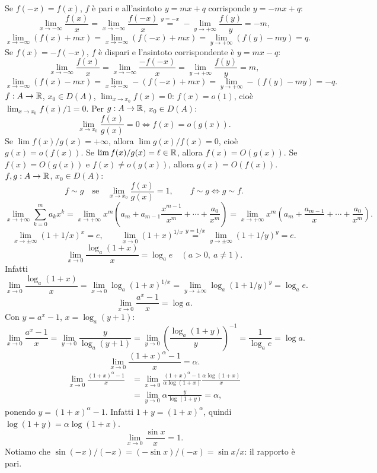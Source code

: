 Se $f(-x)=f(x)$, $f$ è pari e all'asintoto $y=mx+q$ corrisponde $y=-mx+q$:
\[
\lim_{x\to-\infty}\frac{f(x)}x=\lim_{x\to-\infty}\frac{f(-x)}x\overset{y=-x}= -\lim_{y\to+\infty}\frac{f(y)}y=-m,
\]
\[
\lim_{x\to-\infty}(f(x)+mx)=\lim_{x\to-\infty}(f(-x)+mx)=\lim_{y\to+\infty}(f(y)-my)=q.
\]
Se $f(x)=-f(-x)$, $f$ è dispari e l'asintoto corrispondente è $y=mx-q$:
\[
\lim_{x\to-\infty}\frac{f(x)}x=\lim_{x\to-\infty}\frac{-f(-x)}x=\lim_{y\to+\infty}\frac{f(y)}y=m,
\]
\[
\lim_{x\to-\infty}(f(x)-mx)=\lim_{x\to-\infty}-(f(-x)+mx)=\lim_{y\to+\infty}-(f(y)-my)=-q.
\]
$f:A\to\mathbb R$, $x_0\in D(A)$, $\lim_{x\to x_0}f(x)=0$: $f(x)=o(1)$, cioè $\lim_{x\to x_0}f(x)/1=0$.
Per $g:A\to\mathbb R$, $x_0\in D(A)$:
\[
\lim_{x\to x_0}\frac{f(x)}{g(x)}=0\iff f(x)=o(g(x)).
\]
Se $\lim f(x)/g(x)=+\infty$, allora $\lim g(x)/f(x)=0$, cioè $g(x)=o(f(x))$.
Se $\lim f(x)/g(x)=\ell\in\mathbb R$, allora $f(x)=O(g(x))$.
Se $f(x)=O(g(x))$ e $f(x)\ne o(g(x))$, allora $g(x)=O(f(x))$.
$f,g:A\to\mathbb R$, $x_0\in D(A)$:
\[f\sim g\quad\text{se}\quad\lim_{x\to x_0}\frac{f(x)}{g(x)}=1,\qquad f\sim g\iff g\sim f.\]
\[
\lim_{x\to+\infty}\sum_{k=0}^{m}a_kx^k
=\lim_{x\to+\infty}x^m\left(a_m+a_{m-1}\frac{x^{m-1}}{x^m}+\cdots+\frac{a_0}{x^m}\right)
=\lim_{x\to+\infty}x^m\left(a_m+\frac{a_{m-1}}x+\cdots+\frac{a_0}{x^m}\right).
\]
\[\lim_{x\to\pm\infty}(1+1/x)^x=e,\qquad \lim_{x\to0}(1+x)^{1/x}\overset{y=1/x}=\lim_{y\to\pm\infty}(1+1/y)^y=e.\]
\[\lim_{x\to0}\frac{\log_a(1+x)}x=\log_a e\quad(a>0,\ a\ne1).\]
Infatti
\[
\lim_{x\to0}\frac{\log_a(1+x)}x=\lim_{x\to0}\log_a(1+x)^{1/x}
=\lim_{y\to\pm\infty}\log_a(1+1/y)^y=\log_a e.
\]
\[\lim_{x\to0}\frac{a^x-1}x=\log a.\]
Con $y=a^x-1$, $x=\log_a(y+1)$:
\[
\lim_{x\to0}\frac{a^x-1}x=\lim_{y\to0}\frac{y}{\log_a(y+1)}
=\lim_{y\to0}\left(\frac{\log_a(1+y)}y\right)^{-1}=\frac1{\log_a e}=\log a.
\]
\[\lim_{x\to0}\frac{(1+x)^\alpha-1}x=\alpha.\]
\begin{align*}
\lim_{x\to0}\frac{(1+x)^\alpha-1}x
&=\lim_{x\to0}\frac{(1+x)^\alpha-1}{\alpha\log(1+x)}\frac{\alpha\log(1+x)}x\\
&=\lim_{y\to0}\alpha\frac{y}{\log(1+y)}=\alpha,
\end{align*}
ponendo $y=(1+x)^\alpha-1$. Infatti $1+y=(1+x)^\alpha$, quindi $\log(1+y)=\alpha\log(1+x)$.
\[\lim_{x\to0}\frac{\sin x}x=1.\]
Notiamo che $\sin(-x)/(-x)=(-\sin x)/(-x)=\sin x/x$: il rapporto è pari.
\begin{center}\end{center}
